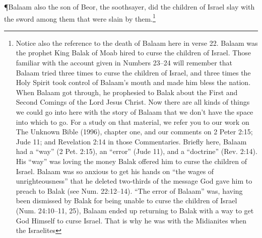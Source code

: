 \P  \textcolor[rgb]{0.00,0.00,1.00}{Balaam also the son of Beor, the soothsayer, did the children of Israel slay with the sword among them that were slain by them.}\footnote{Notice also the reference to the death of
Balaam here in verse 22. Balaam was the
prophet King Balak of Moab hired to curse the
children of Israel. Those familiar with the
account given in Numbers 23–24 will
remember that Balaam tried three times to curse
the children of Israel, and three times the Holy
Spirit took control of Balaam’s mouth and
made him bless the nation. When Balaam got
through, he prophesied to Balak about the First
and Second Comings of the Lord Jesus Christ.
Now there are all kinds of things we could
go into here with the story of Balaam that we
don’t have the space into which to go. For a
study on that material, we refer you to our work
on The Unknown Bible (1996), chapter one,
and our comments on 2 Peter 2:15; Jude 11;
and Revelation 2:14 in those Commentaries.
Briefly here, Balaam had a “way” (2 Pet. 2:15),
an “error” (Jude 11), and a “doctrine” (Rev.
2:14). His “way” was loving the money Balak
offered him to curse the children of Israel.
Balaam was so anxious to get his hands on “the
wages of unrighteousness” that he deleted
two-thirds of the message God gave him to
preach to Balak (see Num. 22:12–14).
“The error of Balaam” was, having been
dismissed by Balak for being unable to curse
the children of Israel (Num. 24:10–11, 25),
Balaam ended up returning to Balak with a way
to get God Himself to curse Israel. That is why
he was with the Midianites when the Israelites
}
